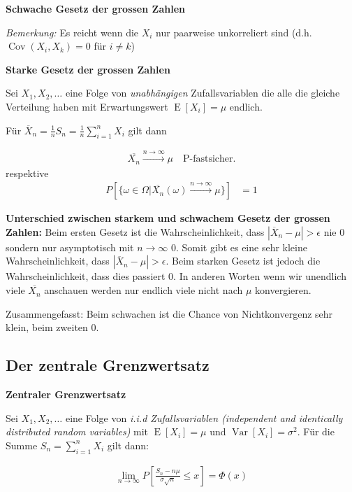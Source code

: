 \documentclass[25pt]{sciposter}
\newcommand{\Var}{\operatorname{Var}}
\newcommand{\E}{\operatorname{E}}
\newenvironment{method}[1]{\begin{mdframed}[backgroundcolor=blue!10,innertopmargin=15pt, innerbottommargin=15pt,nobreak=true]
		\textbf{#1 }
	}
	{ 
	\end{mdframed}
}
\begin{document}
\begin{multicols}{3}
\begin{method}{Schwache Gesetz der grossen Zahlen}
	\textit{Bemerkung:} Es reicht wenn die $X_i$ nur paarweise unkorreliert sind (d.h. $\operatorname{Cov}(X_i,X_k) = 0$ für $i \neq k$)
	
\end{method}


\begin{method}{Starke Gesetz der grossen Zahlen}
	Sei $X_1,X_2,\ldots$ eine Folge von \textit{unabhängigen} Zufallsvariablen die alle die gleiche Verteilung haben mit Erwartungswert $\E[X_i] = \mu$ endlich. 
	
	Für $\overline{X}_n = \frac{1}{n}S_n = \frac{1}{n} \sum_{i=1}^{n} X_i$ gilt dann 
	
	\begin{align*}
		\overline{X_n} \stackrel{n \to \infty}{\longrightarrow} \mu \quad \text{P-fastsicher}.
	\end{align*}  
	respektive
	\begin{align*}
	P\left[ \{ \omega \in \Omega | \overline{X_n}(\omega)  \stackrel{n \to \infty}{\longrightarrow}  \mu  \} \right] &= 1
	\end{align*}
\end{method}

\textbf{Unterschied zwischen starkem und schwachem Gesetz der grossen Zahlen:} Beim ersten Gesetz ist die Wahrscheinlichkeit, dass $|\overline{X}_n - \mu|> \epsilon$ nie 0 sondern nur asymptotisch mit $n \to \infty$ 0. Somit gibt es eine sehr kleine Wahrscheinlichkeit, dass $|\overline{X}_n - \mu| > \epsilon$. Beim starken Gesetz ist jedoch die Wahrscheinlichkeit, dass dies passiert 0. In anderen Worten wenn wir unendlich viele $\overline{X_n}$ anschauen werden nur endlich viele nicht nach $\mu$ konvergieren.

Zusammengefasst: Beim schwachen ist die Chance von Nichtkonvergenz sehr klein, beim zweiten 0.

\subsection*{Der zentrale Grenzwertsatz}


\begin{method}{Zentraler Grenzwertsatz}
	Sei $X_1,X_2,\ldots$ eine Folge von \textit{i.i.d Zufallsvariablen (independent and identically distributed random variables)} mit $\E[X_i] = \mu$ und $\Var[X_i] = \sigma^2$. Für die Summe $S_n = \sum_{i=1}^{n} X_i$ gilt dann:
	
	\begin{align*}
		\lim\limits_{n \to \infty} P\left[ \frac{S_n - n\mu}{\sigma \sqrt{n}} \leq x\right] = \Phi(x)
	\end{align*}


\end{method}
\end{multicols}
\end{document}
